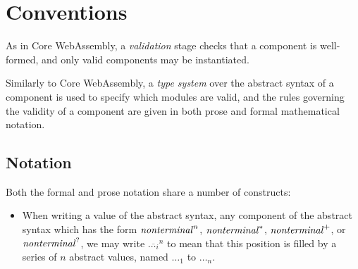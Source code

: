 \section{Conventions}

As in Core WebAssembly, a \emph{validation} stage checks that a
component is well-formed, and only valid components may be
instantiated.

Similarly to Core WebAssembly, a \emph{type system} over the abstract
syntax of a component is used to specify which modules are valid, and
the rules governing the validity of a component are given in both
prose and formal mathematical notation.

\subsection{Notation}

Both the formal and prose notation share a number of constructs:

\begin{itemize}
\item When writing a value of the abstract syntax, any component of
  the abstract syntax which has the form $\mathit{nonterminal}^n$,
  $\mathit{nonterminal}^\ast$, $\mathit{nonterminal}^{+}$, or
  $\mathit{nonterminal}^{?}$, we may write $\overline{\dots_i}^n$ to mean
  that this position is filled by a series of $n$ abstract values,
  named $\dots_1$ to $\dots_n$.
\end{itemize}
